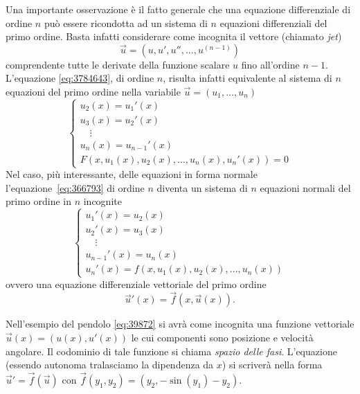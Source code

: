 Una importante osservazione è il fatto generale che una equazione differenziale
di ordine $n$ può essere ricondotta ad un sistema di $n$ equazioni
differenziali del primo ordine.
Basta infatti considerare come incognita il vettore (chiamato \emph{jet})
\[
  \vec u = (u, u', u'', \dots, u^{(n-1)})
\]
comprendente tutte le derivate della funzione scalare $u$ fino all'ordine $n-1$.
L'equazione \eqref{eq:3784643}, di ordine $n$, risulta infatti equivalente
al sistema di $n$ equazioni del primo ordine nella variabile
$\vec u = (u_1, \dots, u_n)$
\[
  \begin{cases}
    u_2(x) = u_1'(x)\\
    u_3(x) = u_2'(x)\\
    \quad \vdots \\
    u_{n}(x) = u_{n-1}'(x)\\
    F(x, u_1(x), u_2(x), \dots, u_n(x), u_n'(x)) = 0
  \end{cases}
\]
Nel caso, più interessante,
delle equazioni in forma normale
l'equazione~\eqref{eq:366793} di ordine $n$
diventa un sistema di $n$ equazioni normali
del primo ordine
in $n$ incognite
\[
  \begin{cases}
  u_1'(x) = u_2(x)\\
  u_2'(x) = u_3(x)\\
  \quad \vdots\\
  u_{n-1}'(x) = u_n(x)\\
  u_n'(x) = f(x,u_1(x), u_2(x), \dots, u_n(x))
  \end{cases}
\]
ovvero una equazione differenziale vettoriale
del primo ordine
\[
  \vec u'(x) = \vec f(x, \vec u(x)).
\]

Nell'esempio del pendolo \eqref{eq:39872} si avrà come incognita una funzione vettoriale
$\vec u(x) = (u(x),u'(x))$ le cui componenti sono posizione e velocità angolare.
Il codominio di tale funzione si chiama \emph{spazio delle fasi}.
L'equazione (essendo autonoma tralasciamo la dipendenza da $x$)
si scriverà nella forma $\vec u' = \vec f(\vec u)$ con
$\vec f(y_1,y_2) = (y_2, -\sin(y_1) - y_2)$.

